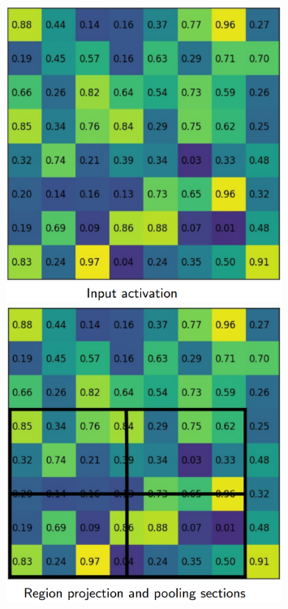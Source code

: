 \documentclass{article}
\begin{document}
\begin{figure}[htbp]
    \centering
    \begin{minipage}{0.5\textwidth}
        \centering
        \includegraphics[width=0.8\textwidth]{roialign1.PNG} %
    \end{minipage}\hfill
    \begin{minipage}{0.5\textwidth}
        \centering
        \includegraphics[width=0.8\textwidth]{roialign2.PNG} %
    \end{minipage}
\end{figure}
\end{document}
